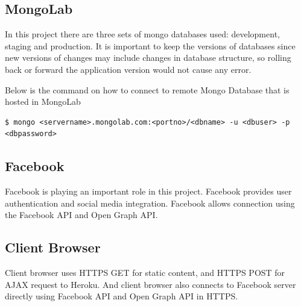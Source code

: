 \subsection{MongoLab}
In this project there are three sets of mongo databases used: development, staging and production. It is important to keep the versions of databases since new versions of changes may include changes in database structure, so rolling back or forward the application version would not cause any error. 

Below is the command on how to connect to remote Mongo Database that is hosted in MongoLab

\begin{lstlisting}
$ mongo <servername>.mongolab.com:<portno>/<dbname> -u <dbuser> -p <dbpassword>
\end{lstlisting}

\subsection{Facebook}
Facebook is playing an important role in this project. Facebook provides user authentication and social media integration. Facebook allows connection using the Facebook API and Open Graph API.

\subsection{Client Browser}
Client browser uses HTTPS GET for static content, and HTTPS POST for AJAX request to Heroku. And client browser also connects to Facebook server directly using Facebook API and Open Graph API in HTTPS.
 
